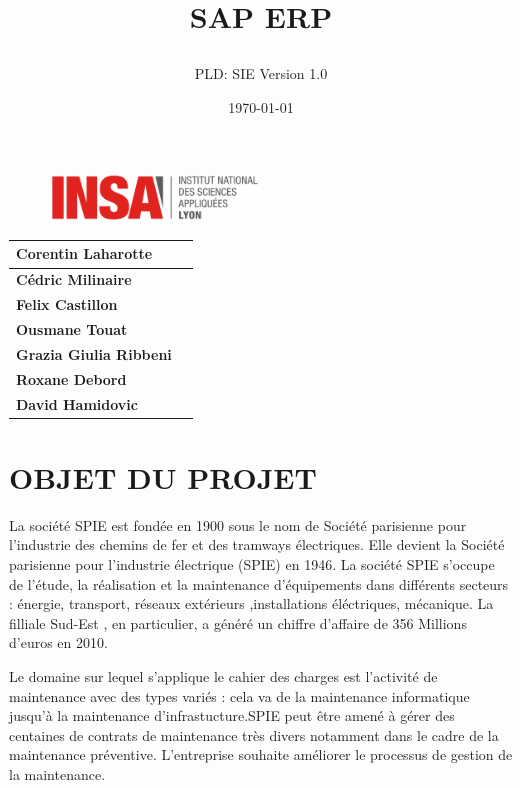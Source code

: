 \documentclass[]{scrartcl}
\title{SAP ERP
\subtitle{}
\author{PLD: SIE
Version 1.0}
\date{\today}}
\begin{document}
\maketitle

\begin{figure}[h]
	\centering
  \includegraphics[width=0.5\textwidth]{img/insa-logo}
	\label{fig:logo}
\end{figure}


\begin{center}
  \begin{tabular}{ | l | r | }
    \hline
    \textbf{Corentin Laharotte}\\ \hline
    \textbf{Cédric Milinaire }\\ \hline
    \textbf{Felix Castillon}\\ \hline
    \textbf{Ousmane Touat}\\ \hline
	\textbf{Grazia Giulia Ribbeni }\\ \hline
	\textbf{Roxane Debord} \\ \hline 
	    \textbf{David Hamidovic}\\ \hline
  \end{tabular}
\end{center}

\thispagestyle{empty}
\pagebreak
\vspace*{10pt}
\tableofcontents
\listoffigures
\newpage
\section{OBJET DU PROJET}
La société SPIE est fondée en 1900 sous le nom de Société parisienne pour l'industrie des chemins de fer et des tramways électriques. Elle devient la Société parisienne pour l'industrie électrique  (SPIE) en 1946. La société SPIE s'occupe de l'étude, la réalisation et la maintenance d'équipements dans différents secteurs : énergie, transport, réseaux extérieurs ,installations éléctriques, mécanique. La filliale Sud-Est , en particulier, a généré un chiffre d'affaire de 356 Millions d'euros en 2010.

Le domaine sur lequel s'applique le cahier des charges est l'activité de maintenance avec des types variés : cela va de la maintenance informatique jusqu'à la maintenance d'infrastucture.SPIE peut être amené à gérer des centaines de contrats de maintenance très divers notamment dans le cadre de la maintenance préventive. L'entreprise souhaite améliorer le processus de gestion de la maintenance.  
\end{document}
